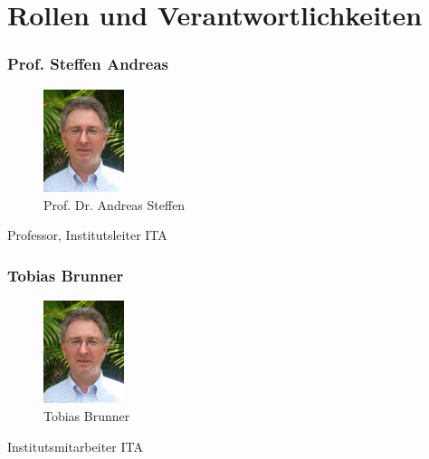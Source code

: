 \section{Rollen und Verantwortlichkeiten}

\subsubsection{Prof. Steffen Andreas}
\noindent\begin{minipage}{0.5\textwidth}
\begin{figure}[H]
	\centering
	\includegraphics[height=30mm]{images/asteffen.jpg}
	\caption{Prof. Dr. Andreas Steffen}
\end{figure}
\end{minipage}
\hfill
\begin{minipage}{0.5\textwidth}
Professor, Institutsleiter ITA \\
\end{minipage}


\subsubsection{Tobias Brunner}
\noindent\begin{minipage}{0.5\textwidth}
\begin{figure}[H]
	\centering
	\includegraphics[height=30mm]{images/asteffen.jpg}
	\caption{Tobias Brunner}
\end{figure}
\end{minipage}
\hfill
\begin{minipage}{0.5\textwidth}
Institutsmitarbeiter ITA \\
\end{minipage}



